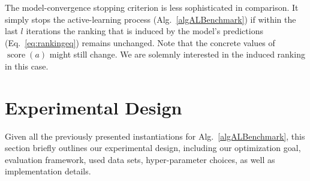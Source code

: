 \documentclass[runningheads]{llncs}
\begin{document}
The model-convergence stopping criterion is less sophisticated in comparison.
It simply stops the active-learning process (Alg.~\ref{algALBenchmark}) if within the last $l$ iterations the ranking that is induced by the model's predictions (Eq.~\ref{eq:rankingeq}) remains unchanged.
Note that the concrete values of $\operatorname{score}\!\left(a\right)$ might still change.
We are solemnly interested in the induced ranking in this case.


\section{Experimental Design}
Given all the previously presented instantiations for Alg.~\ref{algALBenchmark}, this section briefly outlines our experimental design, including our optimization goal, evaluation framework, used data sets, hyper-parameter choices, as well as implementation details.
\end{document}
